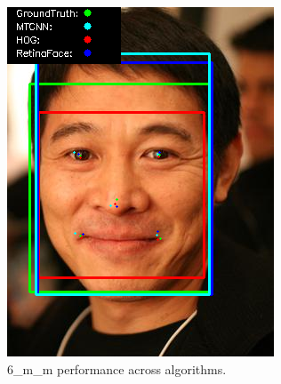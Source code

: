 \documentclass{l4proj}
\begin{document}
\begin{appendices}
\begin{figure}[h!]
  \centering
  \begin{minipage}{0.49\textwidth}
    \centering
     \includegraphics[width=\textwidth]{images/appendix/6.png}
    \caption{6\_m\_m performance across algorithms.}
    \label{whoopi_result}
  \end{minipage}
    \hfill
    \begin{minipage}{0.49\textwidth}
    \centering

\end{minipage}
\end{figure}
\end{appendices}
\end{document}
